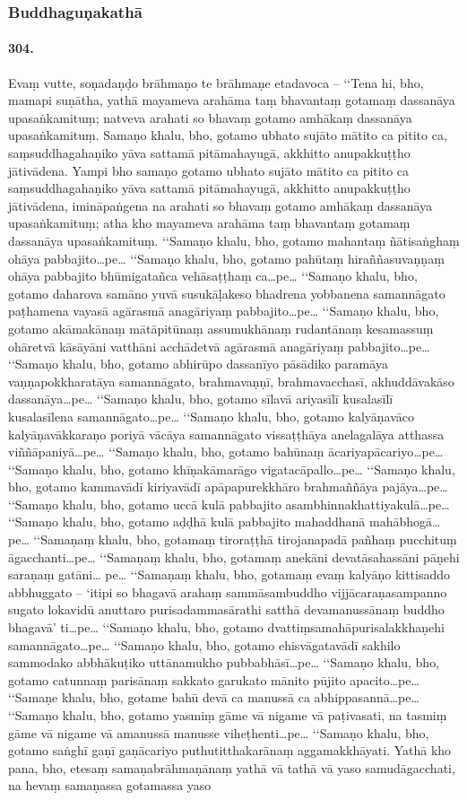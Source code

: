 \subsubsection{Buddhaguṇakathā}

\paragraph{304.} Evaṃ vutte, soṇadaṇḍo brāhmaṇo te brāhmaṇe etadavoca – ‘‘Tena hi, bho, mamapi suṇātha, yathā mayameva arahāma taṃ bhavantaṃ gotamaṃ dassanāya upasaṅkamituṃ; natveva arahati so bhavaṃ gotamo amhākaṃ dassanāya upasaṅkamituṃ. Samaṇo khalu, bho, gotamo ubhato sujāto mātito ca pitito ca, saṃsuddhagahaṇiko yāva sattamā pitāmahayugā, akkhitto anupakkuṭṭho jātivādena. Yampi bho samaṇo gotamo ubhato sujāto mātito ca pitito ca saṃsuddhagahaṇiko yāva sattamā pitāmahayugā, akkhitto anupakkuṭṭho jātivādena, imināpaṅgena na arahati so bhavaṃ gotamo amhākaṃ dassanāya upasaṅkamituṃ; atha kho mayameva arahāma taṃ bhavantaṃ gotamaṃ dassanāya upasaṅkamituṃ. ‘‘Samaṇo khalu, bho, gotamo mahantaṃ ñātisaṅghaṃ ohāya pabbajito…pe… ‘‘Samaṇo khalu, bho, gotamo pahūtaṃ hiraññasuvaṇṇaṃ ohāya pabbajito bhūmigatañca vehāsaṭṭhaṃ ca…pe… ‘‘Samaṇo khalu, bho, gotamo daharova samāno yuvā susukāḷakeso bhadrena yobbanena samannāgato paṭhamena vayasā agārasmā anagāriyaṃ pabbajito…pe… ‘‘Samaṇo khalu, bho, gotamo akāmakānaṃ mātāpitūnaṃ assumukhānaṃ rudantānaṃ kesamassuṃ ohāretvā kāsāyāni vatthāni acchādetvā agārasmā anagāriyaṃ pabbajito…pe… ‘‘Samaṇo khalu, bho, gotamo abhirūpo dassanīyo pāsādiko paramāya vaṇṇapokkharatāya samannāgato, brahmavaṇṇī, brahmavacchasī, akhuddāvakāso dassanāya…pe… ‘‘Samaṇo khalu, bho, gotamo sīlavā ariyasīlī kusalasīlī kusalasīlena samannāgato…pe… ‘‘Samaṇo khalu, bho, gotamo kalyāṇavāco kalyāṇavākkaraṇo poriyā vācāya samannāgato vissaṭṭhāya anelagalāya atthassa viññāpaniyā…pe… ‘‘Samaṇo khalu, bho, gotamo bahūnaṃ ācariyapācariyo…pe… ‘‘Samaṇo khalu, bho, gotamo khīṇakāmarāgo vigatacāpallo…pe… ‘‘Samaṇo khalu, bho, gotamo kammavādī kiriyavādī apāpapurekkhāro brahmaññāya pajāya…pe… ‘‘Samaṇo khalu, bho, gotamo uccā kulā pabbajito asambhinnakhattiyakulā…pe… ‘‘Samaṇo khalu, bho, gotamo aḍḍhā kulā pabbajito mahaddhanā mahābhogā…pe… ‘‘Samaṇaṃ khalu, bho, gotamaṃ tiroraṭṭhā tirojanapadā pañhaṃ pucchituṃ āgacchanti…pe… ‘‘Samaṇaṃ khalu, bho, gotamaṃ anekāni devatāsahassāni pāṇehi saraṇaṃ gatāni… pe… ‘‘Samaṇaṃ khalu, bho, gotamaṃ evaṃ kalyāṇo kittisaddo abbhuggato – ‘itipi so bhagavā arahaṃ sammāsambuddho vijjācaraṇasampanno sugato lokavidū anuttaro purisadammasārathi satthā devamanussānaṃ buddho bhagavā’ ti…pe… ‘‘Samaṇo khalu, bho, gotamo dvattiṃsamahāpurisalakkhaṇehi samannāgato…pe… ‘‘Samaṇo khalu, bho, gotamo ehisvāgatavādī sakhilo sammodako abbhākuṭiko uttānamukho pubbabhāsī…pe… ‘‘Samaṇo khalu, bho, gotamo catunnaṃ parisānaṃ sakkato garukato mānito pūjito apacito…pe… ‘‘Samaṇe khalu, bho, gotame bahū devā ca manussā ca abhippasannā…pe… ‘‘Samaṇo khalu, bho, gotamo yasmiṃ gāme vā nigame vā paṭivasati, na tasmiṃ gāme vā nigame vā amanussā manusse viheṭhenti…pe… ‘‘Samaṇo khalu, bho, gotamo saṅghī gaṇī gaṇācariyo puthutitthakarānaṃ aggamakkhāyati. Yathā kho pana, bho, etesaṃ samaṇabrāhmaṇānaṃ yathā vā tathā vā yaso samudāgacchati, na hevaṃ samaṇassa gotamassa yaso 